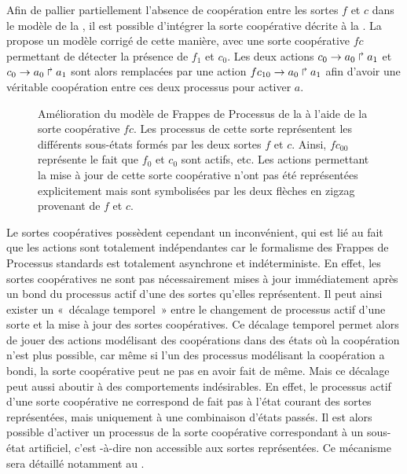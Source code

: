 \begin{example}
  Afin de pallier partiellement l'absence de coopération entre les sortes $f$ et $c$
  dans le modèle de la ,
  il est possible d'intégrer la sorte coopérative
  décrite à la .
  La  propose un modèle corrigé de cette manière,
  avec une sorte coopérative $fc$ permettant de détecter la présence de $f_1$ et $c_0$.
  Les deux actions $c_0\rightarrow a_0\Rsh a_1$ et $c_0\rightarrow a_0\Rsh a_1$
  sont alors remplacées par une action $fc_{10}\rightarrow a_0\Rsh a_1$
  afin d'avoir une véritable coopération entre ces deux processus pour activer $a$.
  
  \begin{figure}[p]
  \begin{center}
  \caption{%
    Amélioration du modèle de Frappes de Processus de la 
    à l'aide de la sorte coopérative $fc$.
    Les processus de cette sorte représentent les différents sous-états formés par les
    deux sortes $f$ et $c$.
    Ainsi, $fc_{00}$ représente le fait que $f_0$ et $c_0$ sont actifs, etc.
    Les actions permettant la mise à jour de cette sorte coopérative n'ont pas
    été représentées explicitement mais sont symbolisées par les deux flèches
    en zigzag provenant de $f$ et $c$.
  }
  \end{center}
  \end{figure}
\end{example}

\myskip

Le sortes coopératives possèdent cependant un inconvénient, qui est lié au fait que les actions
sont totalement indépendantes car
le formalisme des Frappes de Processus standards est totalement asynchrone et indéterministe.
En effet, les sortes coopératives ne sont pas nécessairement mises à jour immédiatement
après un bond du processus actif d'une des sortes qu'elles représentent.
Il peut ainsi exister un «~décalage temporel~» entre le changement de processus actif
d'une sorte et la mise à jour des sortes coopératives.
Ce décalage temporel permet alors de jouer des actions modélisant des coopérations dans des états
où la coopération n'est plus possible,
car même si l'un des processus modélisant la coopération a bondi,
la sorte coopérative peut ne pas en avoir fait de même.
Mais ce décalage peut aussi aboutir à des comportements indésirables.
En effet, le processus actif d'une sorte coopérative ne correspond de fait pas à l'état courant
des sortes représentées, mais uniquement à une combinaison d'états passés.
Il est alors possible d'activer un processus de la sorte coopérative correspondant à
un sous-état artificiel,
c'est -à-dire non accessible aux sortes représentées.
Ce mécanisme sera détaillé notamment au .

